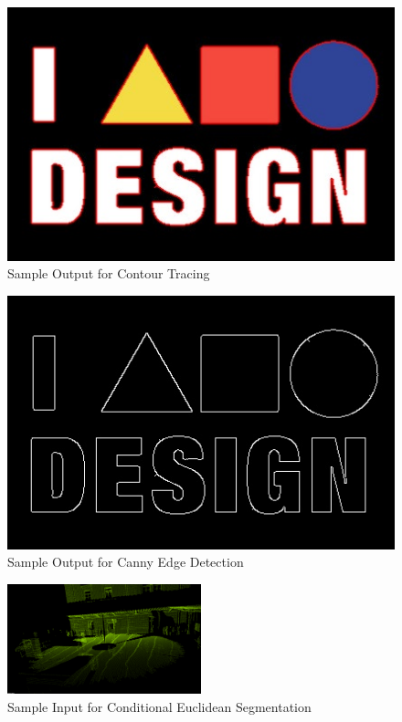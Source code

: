 \begin{figure}[h]
	\includegraphics[scale=0.5]{./figure/contours.jpg}
	\caption{Sample Output for Contour Tracing}
	\label{fig:contour output}
\end{figure}

\begin{figure}[h]
	\includegraphics[scale=0.5]{./figure/canny.jpg}
	\caption{Sample Output for Canny Edge Detection}
	\label{fig:canny output}
\end{figure}
\pagebreak

\begin{figure}[h]
	\includegraphics[width=0.5\textwidth]{./figure/statueBefore.png}
	\caption{Sample Input for Conditional Euclidean Segmentation}
	\label{fig:euclidean input}
\end{figure}

